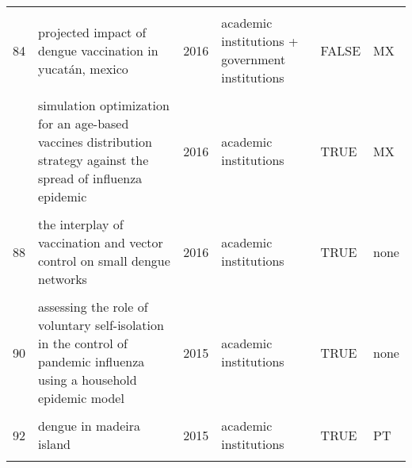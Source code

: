 \documentclass[
]{article}
\begin{document}
\begin{landscape}
\begin{longtable}{l>{\raggedright\arraybackslash}p{4cm}l>{\raggedright\arraybackslash}p{3.5cm}l>{\raggedright\arraybackslash}p{1.5cm}}
\cellcolor{gray!6}{83} & \cellcolor{gray!6}{predicting and evaluating the epidemic trend of ebola virus disease in the 2014-2015 outbreak and the effects of intervention measures} & \cellcolor{gray!6}{2016} & \cellcolor{gray!6}{academic institutions + government institutions} & \cellcolor{gray!6}{FALSE} & \cellcolor{gray!6}{west africa}\\
84 & projected impact of dengue vaccination in yucatán, mexico & 2016 & academic institutions + government institutions & FALSE & MX\\
\cellcolor{gray!6}{85} & \cellcolor{gray!6}{seasonality and the effectiveness of mass vaccination} & \cellcolor{gray!6}{2016} & \cellcolor{gray!6}{academic institutions + NGO} & \cellcolor{gray!6}{FALSE} & \cellcolor{gray!6}{none}\\
\addlinespace
86 & simulation optimization for an age-based vaccines distribution strategy against the spread of influenza epidemic & 2016 & academic institutions & TRUE & MX\\
\cellcolor{gray!6}{87} & \cellcolor{gray!6}{spatiotemporal dynamics of the ebola epidemic in guinea and implications for vaccination and disease elimination: a computational modeling analysis} & \cellcolor{gray!6}{2016} & \cellcolor{gray!6}{academic institutions + government institutions + NGO} & \cellcolor{gray!6}{FALSE} & \cellcolor{gray!6}{GN}\\
88 & the interplay of vaccination and vector control on small dengue networks & 2016 & academic institutions & TRUE & none\\
\cellcolor{gray!6}{89} & \cellcolor{gray!6}{an epidemic patchy model with entry–exit screening} & \cellcolor{gray!6}{2015} & \cellcolor{gray!6}{academic institutions} & \cellcolor{gray!6}{TRUE} & \cellcolor{gray!6}{none}\\
90 & assessing the role of voluntary self-isolation in the control of pandemic influenza using a household epidemic model & 2015 & academic institutions & TRUE & none\\
\addlinespace
\cellcolor{gray!6}{91} & \cellcolor{gray!6}{be-codis: a mathematical model to predict the risk of human diseases spread between countries—validation and application to the 2014–2015 ebola virus disease epidemic} & \cellcolor{gray!6}{2015} & \cellcolor{gray!6}{academic institutions} & \cellcolor{gray!6}{TRUE} & \cellcolor{gray!6}{global}\\
92 & dengue in madeira island & 2015 & academic institutions & TRUE & PT\\
\cellcolor{gray!6}{93} & \cellcolor{gray!6}{dynamic simulation of a seiqr-v epidemic model based on cellular automata} & \cellcolor{gray!6}{2015} & \cellcolor{gray!6}{academic institutions + NGO} & \cellcolor{gray!6}{FALSE} & \cellcolor{gray!6}{MX}\\

\end{longtable}
\end{landscape}
\end{document}
